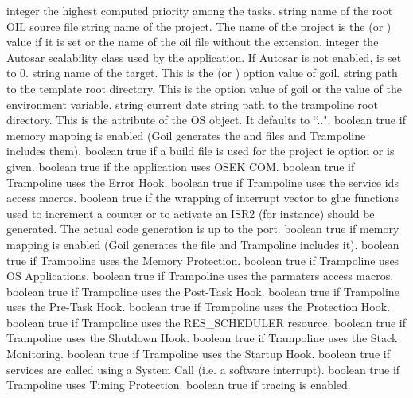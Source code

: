 {integer}
{the highest computed priority among the tasks.} 
{string}
{name of the root OIL source file} 
{string}
{name of the project. The name of the project is the  (or ) value if it is set or the name of the oil file without the extension.} 
{integer}
{the Autosar scalability class used by the application. If Autosar is not enabled,  is set to 0.} 
{string}
{name of the target. This is the  (or ) option value of goil.} 
{string}
{path to the template root directory. This is the  option value of goil or the value of the  environment variable.} 
{string}
{current date} 
{string}
{path to the trampoline root directory. This is the  attribute of the OS object. It defaults to ``..".} 
{boolean}
{true if memory mapping is enabled (Goil generates the  and  files and Trampoline includes them).} 
{boolean}
{true if a build file is used for the project ie option  or  is given.} 
{boolean}
{true if the application uses OSEK COM.} 
{boolean}
{true if Trampoline uses the Error Hook.} 
{boolean}
{true if Trampoline uses the service ids access macros.} 
{boolean}
{true if the wrapping of interrupt vector to glue functions used to increment a counter or to activate an ISR2 (for instance) should be generated. The actual code generation is up to the port.} 
{boolean}
{true if memory mapping is enabled (Goil generates the  file and Trampoline includes it).} 
{boolean}
{true if Trampoline uses the Memory Protection.} 
{boolean}
{true if Trampoline uses OS Applications.} 
{boolean}
{true if Trampoline uses the parmaters access macros.} 
{boolean}
{true if Trampoline uses the Post-Task Hook.} 
{boolean}
{true if Trampoline uses the Pre-Task Hook.} 
{boolean}
{true if Trampoline uses the Protection Hook.} 
{boolean}
{true if Trampoline uses the RES_SCHEDULER resource.} 
{boolean}
{true if Trampoline uses the Shutdown Hook.} 
{boolean}
{true if Trampoline uses the Stack Monitoring.} 
{boolean}
{true if Trampoline uses the Startup Hook.} 
{boolean}
{true if services are called using a System Call (i.e. a software interrupt).} 
{boolean}
{true if Trampoline uses Timing Protection.} 
{boolean}
{true if tracing is enabled.} 
